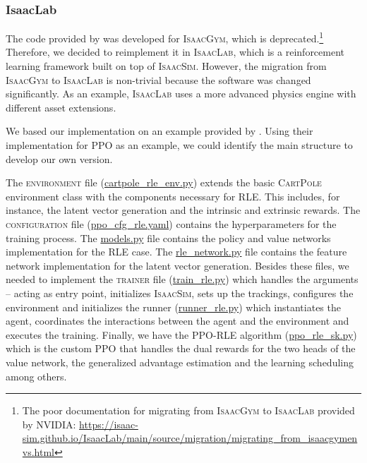 \documentclass[10pt]{article} %
\begin{document}
\subsubsection{IsaacLab}
The code provided by \cite{rle-paper} was developed for \textsc{IsaacGym}, which is deprecated.\footnote{The poor documentation for migrating from \textsc{IsaacGym} to \textsc{IsaacLab} provided by NVIDIA: \url{https://isaac-sim.github.io/IsaacLab/main/source/migration/migrating_from_isaacgymenvs.html}} Therefore, we decided to reimplement it in \textsc{IsaacLab}, which is a reinforcement learning framework built on top of \textsc{IsaacSim}. However, the migration from \textsc{IsaacGym} to \textsc{IsaacLab} is non-trivial because the software was changed significantly. As an example, \textsc{IsaacLab} uses a more advanced physics engine with different asset extensions.

We based our implementation on an example provided by \cite{skrl-paper}. Using their implementation for \textsc{PPO} as an example, we could identify the main structure to develop our own version. 

The \textsc{environment} file (\url{cartpole\_rle\_env.py}) extends the basic \textsc{CartPole} environment class with the components necessary for \textsc{RLE}. This includes, for instance, the latent vector generation and the intrinsic and extrinsic rewards. The \textsc{configuration} file (\url{ppo\_cfg\_rle.yaml}) contains the hyperparameters for the training process. The \url{models.py} file contains the policy and value networks implementation for the \textsc{RLE} case. The \url{rle\_network.py} file contains the feature network implementation for the latent vector generation. Besides these files, we needed to implement the \textsc{trainer} file (\url{train\_rle.py}) which handles the arguments -- acting as entry point, initializes \textsc{IsaacSim}, sets up the trackings, configures the environment and initializes the runner (\url{runner\_rle.py}) which instantiates the agent, coordinates the interactions between the agent and the environment and executes the training. Finally, we have the \textsc{PPO}-\textsc{RLE} algorithm (\url{ppo\_rle\_sk.py}) which is the custom \textsc{PPO} that handles the dual rewards for the two heads of the value network, the generalized advantage estimation and the learning scheduling among others. 
\end{document}
